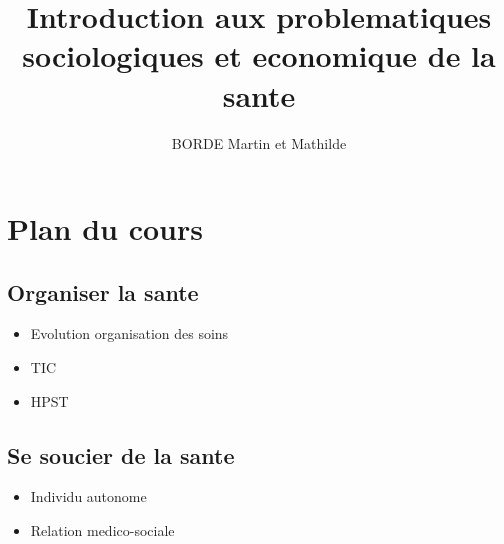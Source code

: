 \documentclass{article}
\title{Introduction aux problematiques sociologiques et economique de la sante}
\author{BORDE Martin et Mathilde}
\begin{document}
\maketitle

\newpage
\section{Plan du cours}
\subsection{Organiser la sante}
\begin{itemize}[label=\textbullet]
	\item Evolution organisation des soins
	\item TIC
	\item HPST
\end{itemize}
\subsection{Se soucier de la sante}
\begin{itemize}[label=\textbullet]
	\item Individu autonome
	\item Relation medico-sociale
\end{itemize}
\end{document}
